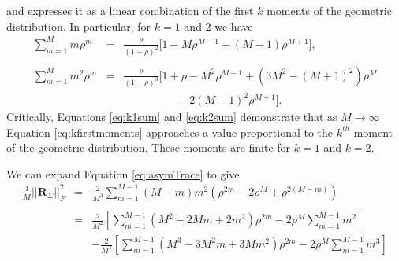 \documentclass[letterpaper,12pt,oneside,final]{article}
\newcommand{\m}[1]{\mathbf{#1}}               %
\newcommand{\norm}[1]{||{#1}||}              %
\newcommand{\frob}[1]{\norm{#1}_F}
\begin{document}
and expresses it as a linear combination of the first $k$ moments of the geometric distribution. In particular, for $k = 1$ and $2$ we have
\begin{eqnarray}
  \sum_{m = 1}^{M} m \rho^m & = & \frac{\rho}{(1 - \rho)^2} \Big [ 1 - M\rho^{M-1} + (M-1)\rho^{M+1} \Big ], \label{eq:k1sum} \\
  & & \nonumber \\
  \sum_{m = 1}^{M} m^2 \rho^m & = & \frac{\rho}{(1 - \rho)^3} \Big [ 1 + \rho - M^2 \rho^{M-1} + (3M^2 - (M+1)^2) \rho^M \label{eq:k2sum} \\
  & & \hspace{2cm} - 2(M-1)^2 \rho^{M+1} \Big ]. \nonumber
\end{eqnarray}
Critically, Equations \ref{eq:k1sum} and \ref{eq:k2sum} demonstrate that as $M \rightarrow \infty$ Equation \ref{eq:kfirstmoments} approaches a value proportional to the $k^{th}$ moment of the geometric distribution. These moments are finite for $k = 1$ and $k = 2$.

We can expand Equation \ref{eq:asymTrace} to give
\begin{eqnarray}
  \frac{1}{M} \frob{\m{R}_{\Sigma}}^2 & = & \frac{2}{M^3} \sum_{m = 1}^{M-1} (M-m) m^2 \left ( \rho^{2m} - 2 \rho^{M} + \rho^{2(M - m)} \right ) \nonumber \\
  & & \nonumber \\
  & = & \frac{2}{M^2} \left [ \sum_{m = 1}^{M-1} (M^2 - 2Mm + 2m^2) \rho^{2m} - 2 \rho^M \sum_{m = 1}^{M-1} m^2 \right ] \nonumber \\
  & & - \frac{2}{M^3} \left [ \sum_{m = 1}^{M-1} (M^3 - 3M^2m + 3Mm^2) \rho^{2m} - 2 \rho^M \sum_{m = 1}^{M-1} m^3 \right ] \nonumber 
\end{eqnarray}
\end{document}
